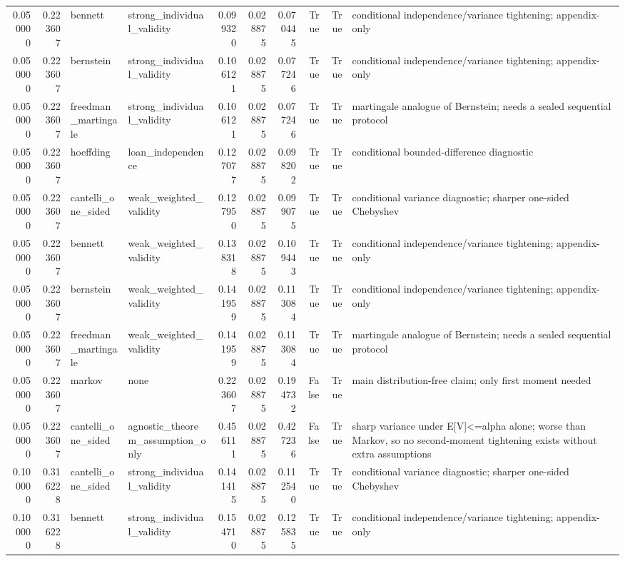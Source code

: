 \begin{tabular}{rrllrrrrrl}
0.050000 & 0.223607 & bennett & strong\_individual\_validity & 0.099320 & 0.028875 & 0.070445 & True & True & conditional independence/variance tightening; appendix-only \\
0.050000 & 0.223607 & bernstein & strong\_individual\_validity & 0.106121 & 0.028875 & 0.077246 & True & True & conditional independence/variance tightening; appendix-only \\
0.050000 & 0.223607 & freedman\_martingale & strong\_individual\_validity & 0.106121 & 0.028875 & 0.077246 & True & True & martingale analogue of Bernstein; needs a sealed sequential protocol \\
0.050000 & 0.223607 & hoeffding & loan\_independence & 0.127077 & 0.028875 & 0.098202 & True & True & conditional bounded-difference diagnostic \\
0.050000 & 0.223607 & cantelli\_one\_sided & weak\_weighted\_validity & 0.127950 & 0.028875 & 0.099075 & True & True & conditional variance diagnostic; sharper one-sided Chebyshev \\
0.050000 & 0.223607 & bennett & weak\_weighted\_validity & 0.138318 & 0.028875 & 0.109443 & True & True & conditional independence/variance tightening; appendix-only \\
0.050000 & 0.223607 & bernstein & weak\_weighted\_validity & 0.141959 & 0.028875 & 0.113084 & True & True & conditional independence/variance tightening; appendix-only \\
0.050000 & 0.223607 & freedman\_martingale & weak\_weighted\_validity & 0.141959 & 0.028875 & 0.113084 & True & True & martingale analogue of Bernstein; needs a sealed sequential protocol \\
0.050000 & 0.223607 & markov & none & 0.223607 & 0.028875 & 0.194732 & False & True & main distribution-free claim; only first moment needed \\
0.050000 & 0.223607 & cantelli\_one\_sided & agnostic\_theorem\_assumption\_only & 0.456111 & 0.028875 & 0.427236 & False & True & sharp variance under E[V]<=alpha alone; worse than Markov, so no second-moment tightening exists without extra assumptions \\
0.100000 & 0.316228 & cantelli\_one\_sided & strong\_individual\_validity & 0.141415 & 0.028875 & 0.112540 & True & True & conditional variance diagnostic; sharper one-sided Chebyshev \\
0.100000 & 0.316228 & bennett & strong\_individual\_validity & 0.154710 & 0.028875 & 0.125835 & True & True & conditional independence/variance tightening; appendix-only \\

\end{tabular}
